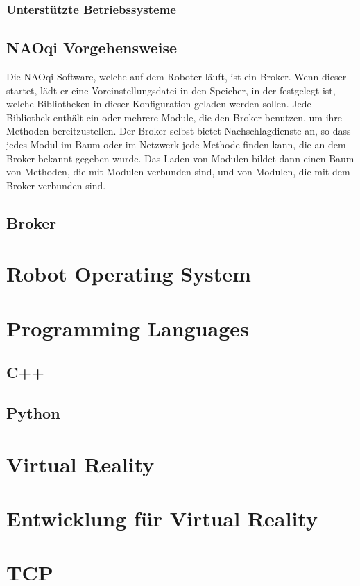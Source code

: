 \subsubsection{Unterstützte Betriebssysteme}
\label{subsubsec:UnterstützteBetriebssysteme}

\subsection{NAOqi Vorgehensweise}
\label{subsec:NAOqiVorgehensweise}
Die NAOqi Software, welche auf dem Roboter läuft, ist ein Broker. Wenn dieser startet, lädt er eine Voreinstellungsdatei in den Speicher, in der festgelegt ist, welche Bibliotheken in dieser Konfiguration geladen werden sollen. Jede Bibliothek enthält ein oder mehrere Module, die den Broker benutzen, um ihre Methoden bereitzustellen.
Der Broker selbst bietet Nachschlagdienste an, so dass jedes Modul im Baum oder im Netzwerk jede Methode finden kann, die an dem Broker bekannt gegeben wurde.
Das Laden von Modulen bildet dann einen Baum von Methoden, die mit Modulen verbunden sind, und von Modulen, die mit dem Broker verbunden sind.

\subsection{Broker}
\label{subsec:Broker}







\section{Robot Operating System}
\label{sec:ROS}

\section{Programming Languages}

\subsection{C++}
\label{subsec:Cpp}

\subsection{Python}
\label{subsec:Python}

\section{Virtual Reality}

\section{Entwicklung für Virtual Reality}
\section{TCP}